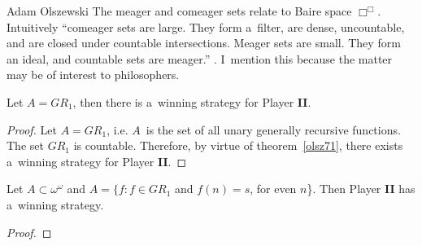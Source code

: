 \begin{artengenv}{Adam Olszewski}
The meager and comeager sets relate to Baire space $\Box^\Box$. Intuitively ``comeager sets are large. They form a~filter, are dense, uncountable, and are closed under countable intersections. Meager sets are small. They form an ideal, and countable sets are meager.''
\parencite[][p.212]{soare_turing_2016}. %
 I~mention this because the matter may be of interest to philosophers.
\begin{proposition}
Let $A=GR_{1}$, then there is a~winning strategy for Player \textbf{II}.
\end{proposition}
\begin{proof}
Let $A=GR_{1}$, i.e. $A$~is the set of all unary generally recursive functions. The set $GR_{1}$ is countable. Therefore, by virtue of theorem~\ref{olsz71}, there exists a~winning strategy for Player \textbf{II}.
\end{proof}
%

\begin{proposition}
Let $A \subset \omega^{\omega}$ and $A = \{f: f \in GR_{1}$ and $f(n)=s$, for even $n$\}. Then Player \textbf{II} has a~winning strategy.
\end{proposition}
\begin{proof}
\end{proof}
%


\end{artengenv}
